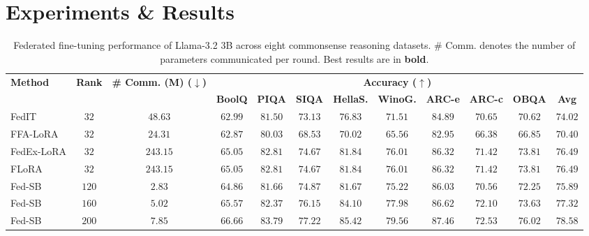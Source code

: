 
\section{Experiments \& Results}\label{sec:experiments}


\begin{table*}[!h]
\centering
\setlength{\tabcolsep}{3.5pt}
\small
\begin{tabular}{lcc|ccccccccc}
\toprule
\multirow{2}{*}{\bf Method} & \multirow{2}{*}{\bf Rank} & \multirow{2}{*}{\bf \# Comm. (M) ($\downarrow$)} & \multicolumn{9}{c}{\textbf{Accuracy ($\uparrow$)}} \\
 &  &  & \textbf{BoolQ} & \textbf{PIQA} & \textbf{SIQA} & \textbf{HellaS.} & \textbf{WinoG.} & \textbf{ARC-e} & \textbf{ARC-c} & \textbf{OBQA} & \textbf{Avg} \\
\midrule
FedIT & $32$ & $48.63$ & $62.99$ & $81.50$ & $73.13$ & $76.83$ & $71.51$ & $84.89$ & $70.65$ & $70.62$ & $74.02$ \\
FFA-LoRA   & $32$ & $24.31$ & $62.87$ & $80.03$ & $68.53$ & $70.02$ & $65.56$ & $82.95$ & $66.38$ & $66.85$ & $70.40$ \\
FedEx-LoRA & $32$ & $243.15$ & $65.05$ & $82.81$ & $74.67$ & $81.84$ & $76.01$ & $86.32$ & $71.42$ & $73.81$ & $76.49$ \\
FLoRA & $32$ & $243.15$ & $65.05$ & $82.81$ & $74.67$ & $81.84$ & $76.01$ & $86.32$ & $71.42$ & $73.81$ & $76.49$ \\
\rowcolor{cyan!10} 
Fed-SB & $120$ & $2.83$  & $64.86$ & $81.66$ & $74.87$ & $81.67$ & $75.22$ & $86.03$ & $70.56$ & $72.25$ & $75.89$ \\
\rowcolor{cyan!10} 
Fed-SB & $160$ & $5.02$  & $65.57$ & $82.37$ & $76.15$ & $84.10$ & $77.98$ & $86.62$ & $72.10$ & $73.63$ & $77.32$ \\
\rowcolor{cyan!10} 
Fed-SB & $200$ & $7.85$  & $\mathbf{66.66}$ & $\mathbf{83.79}$ & $\mathbf{77.22}$ & $\mathbf{85.42}$ & $\mathbf{79.56}$ & $\mathbf{87.46}$ & $\mathbf{72.53}$ & $\mathbf{76.02}$ & $\mathbf{78.58}$ \\
\bottomrule
\end{tabular}
\caption{Federated fine-tuning performance of Llama-3.2 3B across eight commonsense reasoning datasets. \# Comm. denotes the number of parameters communicated per round. Best results are in \textbf{bold}.
}
\label{tab:commonsense}
\end{table*}

